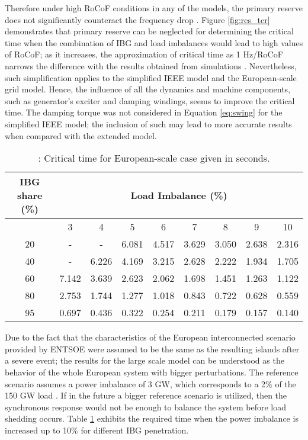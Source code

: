 Therefore under high RoCoF conditions in any of the models, the primary reserve does not significantly counteract the frequency drop \cite{dena2014}. Figure \ref{fig:res_tcr} demonstrates that primary reserve can be neglected for determining the critical time when the combination of IBG and load imbalances would lead to high values of RoCoF; as it increases, the approximation of critical time as 1 Hz/RoCoF narrows the difference with the results obtained from simulations \cite{miller2017technology}. Nevertheless, such simplification applies to the simplified IEEE model and the European-scale grid model. Hence, the influence of all the dynamics and machine components, such as generator's exciter and damping windings, seems to improve the critical time. The damping torque was not considered in Equation \eqref{eq:swing} for the simplified IEEE model; the inclusion of such may lead to more accurate results when compared with the extended model.
\begin{table}[h]
	\caption{\label{tb:crtime}: Critical time for European-scale case given in seconds.}
	\centering
	\begin{tabular}{*9c}
		\toprule
		\textbf{IBG share (\%)}	& \multicolumn{8}{c}{\textbf{Load Imbalance (\%)}} \\
		\midrule
		{} & 3&	4&	5&	6&	7&	8&	9	&10 \\
		\midrule
		20&	-    &	-    &	6.081&	4.517&	3.629&	3.050&	2.638&	2.316\\
		40&	-    &	6.226&	4.169&	3.215&	2.628&	2.222&	1.934&	1.705\\
		60&7.142 &	3.639&	2.623&	2.062&	1.698&	1.451&	1.263&	1.122\\
		80&	2.753&	1.744&	1.277&	1.018&	0.843&	0.722&	0.628&	0.559\\

		95&	0.697&	0.436&	0.322&	0.254&	0.211&	0.179&	0.157&	0.140\\
		\bottomrule
	\end{tabular}
\end{table}


Due to the fact that the characteristics of the  European interconnected scenario provided by ENTSOE were assumed to be the same as the resulting islands after a severe event; the results for the large scale model can be understood as the behavior of the whole European system with bigger perturbations. The reference scenario assumes a power imbalance of 3 GW, which corresponds to a 2\% of the 150 GW load \cite{ENTSOE.2016}. If in the future a bigger reference scenario is utilized, then the synchronous response would not be enough to balance the system before load shedding occurs. Table \ref{tb:crtime} exhibits the required time when the power imbalance is increased up to 10\% for different IBG penetration.



